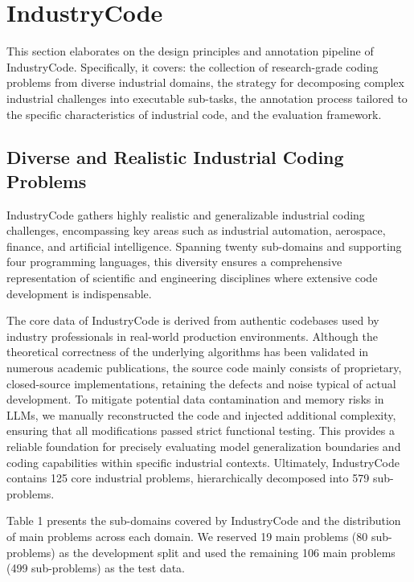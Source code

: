 \documentclass{article}
\theoremstyle{plain}
\theoremstyle{definition}
\theoremstyle{remark}
\begin{document}
\section{IndustryCode}

This section elaborates on the design principles and annotation pipeline 
of IndustryCode. Specifically, it covers: 
the collection of research-grade coding problems from diverse industrial domains, 
the strategy for decomposing complex industrial challenges into executable sub-tasks, the annotation process tailored to the specific characteristics of industrial code, and
the evaluation framework.



\subsection{Diverse and Realistic Industrial Coding Problems}

IndustryCode gathers highly realistic and generalizable industrial coding challenges,
encompassing key areas such as industrial automation, aerospace, finance,
and artificial intelligence. Spanning twenty sub-domains and supporting four programming languages,
this diversity ensures a comprehensive representation of scientific and engineering disciplines 
where extensive code development is indispensable.


The core data of IndustryCode is derived from authentic codebases used by industry professionals 
in real-world production environments. Although the theoretical correctness of the underlying algorithms has been validated in numerous academic publications, the source code mainly consists of proprietary, closed-source implementations, retaining the defects and noise typical of actual development. To mitigate potential data contamination and memory risks in LLMs, we manually reconstructed the code and injected additional complexity, ensuring that all modifications passed strict functional testing. This provides a reliable foundation for precisely evaluating model generalization boundaries and coding capabilities within specific industrial contexts. Ultimately, IndustryCode contains 125 core industrial problems, hierarchically decomposed into 579 sub-problems.

Table 1 presents the sub-domains covered by IndustryCode and the distribution of main problems across each domain. We reserved 19 main problems (80 sub-problems) as the development split and used the remaining 106 main problems (499 sub-problems) as the test data.
\end{document}
